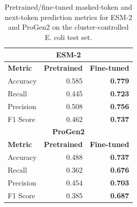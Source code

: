 \begin{table}[t]
\centering
\caption{Pretrained/fine-tuned masked-token and next-token prediction metrics for ESM-2 and ProGen2 on the cluster-controlled E. coli test set.}
\label{tab:ecoli_token_prediction_metrics_cluster95}
\begin{tabular}{lrr}
\hline
\multicolumn{3}{c}{\textbf{ESM-2}} \\
\hline
\textbf{Metric} & \textbf{Pretrained} & \textbf{Fine-tuned} \\
\hline
Accuracy & 0.585 & \textbf{0.779} \\
Recall & 0.445 & \textbf{0.723} \\
Precision & 0.508 & \textbf{0.756} \\
F1 Score & 0.462 & \textbf{0.737} \\
\hline
\multicolumn{3}{c}{\textbf{ProGen2}} \\
\hline
\textbf{Metric} & \textbf{Pretrained} & \textbf{Fine-tuned} \\
\hline
Accuracy & 0.488 & \textbf{0.737} \\
Recall & 0.362 & \textbf{0.676} \\
Precision & 0.454 & \textbf{0.703} \\
F1 Score & 0.385 & \textbf{0.687} \\
\hline
\end{tabular}
\end{table}
